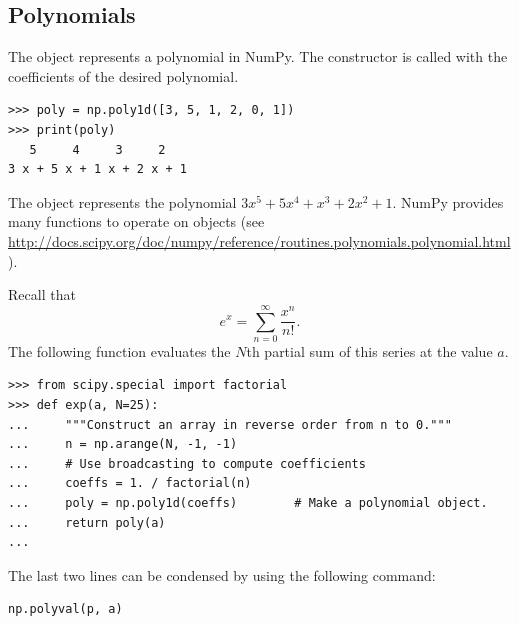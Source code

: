 \subsection*{Polynomials} %

The  object represents a polynomial in NumPy.
The constructor is called with the coefficients of the desired polynomial.

\begin{lstlisting}
>>> poly = np.poly1d([3, 5, 1, 2, 0, 1])
>>> print(poly)
   5     4     3     2
3 x + 5 x + 1 x + 2 x + 1
\end{lstlisting}

The object  represents the polynomial $3x^5+5x^4+x^3+2x^2+1$.
NumPy provides many functions to operate on  objects (see \url{http://docs.scipy.org/doc/numpy/reference/routines.polynomials.polynomial.html}).

Recall that
\[
e^x = \sum_{n=0}^{\infty} \frac{x^n}{n!}.
\]
The following function evaluates the $N$th partial sum of this series at the value $a$.

\begin{lstlisting}
>>> from scipy.special import factorial
>>> def exp(a, N=25):
...     """Construct an array in reverse order from n to 0."""
...     n = np.arange(N, -1, -1)
...     # Use broadcasting to compute coefficients
...     coeffs = 1. / factorial(n)
...     poly = np.poly1d(coeffs)        # Make a polynomial object.
...     return poly(a)
...
\end{lstlisting}

The last two lines can be condensed by using the following command:

\begin{lstlisting}
np.polyval(p, a)
\end{lstlisting}

%



